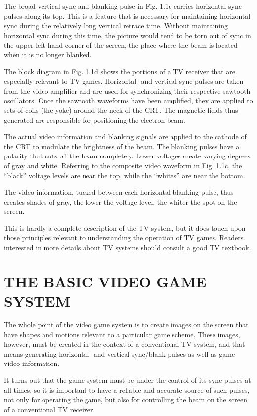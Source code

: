 \documentclass[11pt]{book}              %
\begin{document}
The broad vertical sync and blanking pulse in Fig. 1.1c carries horizontal-sync pulses along its top. This is a feature that is necessary for maintaining horizontal sync during the relatively long vertical retrace time. Without maintaining horizontal sync during this time, the picture would tend to be torn out of sync in the upper left-hand corner of the screen, the place where the beam is located when it is no longer blanked.

The block diagram in Fig. 1.1d shows the portions of a TV receiver that are especially relevant to TV games. Horizontal- and vertical-sync pulses are taken from the video amplifier and are used for synchronizing their respective sawtooth oscillators. Once the sawtooth waveforms have been amplified, they are applied to sets of coils (the yoke) around the neck of the CRT. The magnetic fields thus generated are responsible for positioning the electron beam.

The actual video information and blanking signals are applied to the cathode of the CRT to modulate the brightness of the beam. The blanking pulses have a polarity that cuts off the beam completely. Lower voltages create varying degrees of gray and white. Referring to the composite video waveform in Fig. 1.1c, the “black” voltage levels are near the top, while the “whites” are near the bottom.

The video information, tucked between each horizontal-blanking pulse, thus creates shades of gray, the lower the voltage level, the whiter the spot on the screen.

This is hardly a complete description of the TV system, but it does touch upon those principles relevant to understanding the operation of TV games. Readers interested in more details about TV systems should consult a good TV textbook.

\newpage
\section{THE BASIC VIDEO GAME SYSTEM}

The whole point of the video game system is to create images on the screen that have shapes and motions relevant to a particular game scheme. These images, however, must be created in the context of a conventional TV system, and that means generating horizontal- and vertical-sync/blank pulses as well as game video information.

It turns out that the game system must be under the control of its sync pulses at all times, so it is important to have a reliable and accurate source of such pulses, not only for operating the game, but also for controlling the beam on the screen of a conventional TV receiver.
\end{document}
